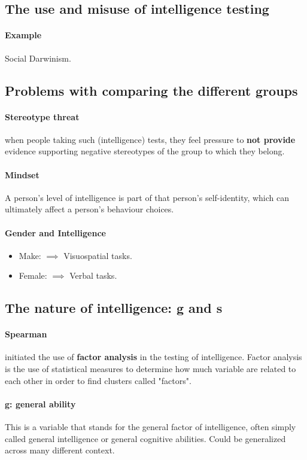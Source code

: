 \documentclass{article}
\begin{document}
	\subsection{The use and misuse of intelligence testing}
	\paragraph{Example} Social Darwinism.
	\subsection{Problems with comparing the different groups}
	\paragraph{Stereotype threat} when people taking such (intelligence) tests, they feel pressure to \textbf{not provide} evidence supporting negative stereotypes of the group to which they belong.
	\paragraph{Mindset} A person's level of intelligence is part of that person's self-identity, which can ultimately affect a person's behaviour choices.
	\paragraph{Gender and Intelligence}
	\begin{itemize}
		\item Make: $\implies$ Visuospatial tasks.
		\item Female: $\implies$ Verbal tasks.
	\end{itemize}
	\subsection{The nature of intelligence: g and s}
	\paragraph{Spearman} initiated the use of \textbf{factor analysis} in the testing of intelligence. Factor analysis is the use of statistical measures to determine how much variable are related to each other in order to find clusters called "factors".
	\paragraph{g: general ability} This is a variable that stands for the general factor of intelligence, often simply called general intelligence or general cognitive abilities. Could be generalized across many different context.
\end{document}
